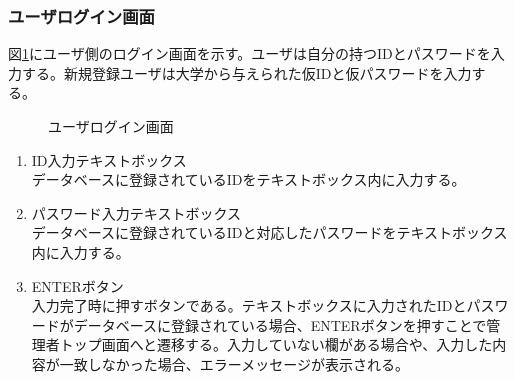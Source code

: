\documentclass[a4j]{jarticle}
\begin{document}
\subsubsection{ユーザログイン画面}
図\ref{fig:login_user}にユーザ側のログイン画面を示す。ユーザは自分の持つIDとパスワードを入力する。新規登録ユーザは大学から与えられた仮IDと仮パスワードを入力する。
\begin{figure}[H]
\centering
{}
\caption{ユーザログイン画面}
\label{fig:login_user}
\end{figure}
\begin{enumerate}
  \renewcommand{\labelenumi}{\textcircled{\scriptsize \theenumi}}

\item ID入力テキストボックス\\
データベースに登録されているIDをテキストボックス内に入力する。
\item パスワード入力テキストボックス\\
データベースに登録されているIDと対応したパスワードをテキストボックス内に入力する。
\item ENTERボタン\\
入力完了時に押すボタンである。テキストボックスに入力されたIDとパスワードがデータベースに登録されている場合、ENTERボタンを押すことで管理者トップ画面へと遷移する。入力していない欄がある場合や、入力した内容が一致しなかった場合、エラーメッセージが表示される。
\end{enumerate}
\end{document}
